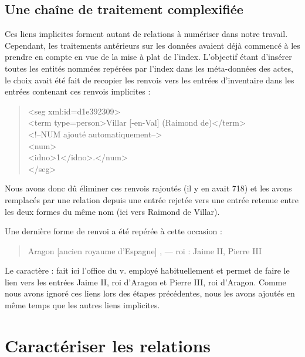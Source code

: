 \documentclass[a4paper,12pt,twoside]{book}
\begin{document}
	\subsection{Une chaîne de traitement complexifiée}
	
	Ces liens implicites forment autant de relations à numériser dans notre travail. Cependant, les traitements antérieurs sur les données avaient déjà commencé à les prendre en compte en vue de la mise à plat de l'index. L'objectif étant d'insérer toutes les entités nommées repérées par l'index dans les méta-données des actes, le choix avait été fait de recopier les renvois vers les entrées d'inventaire dans les entrées contenant ces renvois implicites :
	
	\begin{quotation}
               <seg xml:id=\textquotesingle d1e392309\textquotesingle >\\
				\indent\indent<term type=\textquotesingle person\textquotesingle >Villar [-en-Val] (Raimond de)</term>\\
				\indent\indent<!--NUM ajouté automatiquement-->\\
				\indent{}\\
				\indent\indent\indent<idno>1</idno>.</num>\\
				\indent</seg>
	\end{quotation}
	
	
	\noindent Nous avons donc dû éliminer ces renvois rajoutés (il y en avait 718) et les avons remplacés par une relation depuis une entrée rejetée vers une entrée retenue entre les deux formes du même nom (ici vers \og Raimond de Villar\fg{}).
	
	Une dernière forme de renvoi a été repérée à cette occasion :
	
	\begin{quotation}
		Aragon [ancien royaume d'Espagne] , — roi : Jaime II, Pierre III
	\end{quotation}
	
	\noindent Le caractère \og :\fg{} fait ici l'office du \og v.\fg{} employé habituellement et permet de faire le lien vers les entrées \og Jaime II, roi d'Aragon\fg{} et \og Pierre III, roi d'Aragon\fg{}. Comme nous avons ignoré ces liens lors des étapes précédentes, nous les avons ajoutés en même temps que les autres liens implicites.
	
	\section{Caractériser les relations}
	
\end{document}
